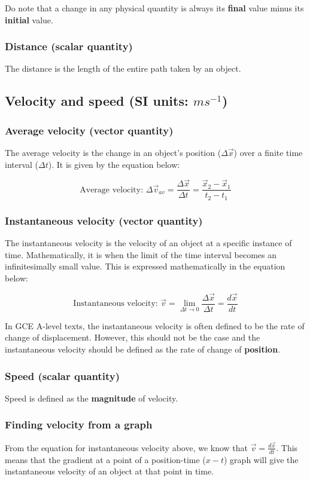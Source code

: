 \documentclass[11pt]{article}
\begin{document}
Do note that a change in any physical quantity is always its \textbf{final} value minus its \textbf{initial} value.
\subsubsection{Distance (scalar quantity)}
\label{sec:org10ef643}
The distance is the length of the entire path taken by an object.
\subsection{Velocity and speed (SI units: \(\si{ms^{-1}}\))}
\label{sec:orgc83176a}

\subsubsection{Average velocity (vector quantity)}
\label{sec:orgd958dd2}
The average velocity is the change in an object's position (\(\Delta \vec{x}\)) over a finite time interval (\(\Delta t\)). It is given by the equation below:

\[\text{Average velocity: } \Delta \vec{v}_{av} = \frac{\Delta \vec{x}}{\Delta t} = \frac{\vec{x}_2 - \vec{x}_1}{t_2 - t_1}\]
\subsubsection{Instantaneous velocity (vector quantity)}
\label{sec:orgadb11ac}
The instantaneous velocity is the velocity of an object at a specific instance of time. Mathematically, it is when the limit of the time interval becomes an infinitesimally small value. This is expressed mathematically in the equation below:

\[\text{Instantaneous velocity: } \vec{v} = \lim_{\Delta t \rightarrow 0} \frac{\Delta \vec{x}}{\Delta t} = \frac{d \vec{x}}{dt}\]

In GCE A-level texts, the instantaneous velocity is often defined to be the rate of change of displacement. However, this should not be the case and the instantaneous velocity should be defined as the rate of change of \textbf{position}.
\subsubsection{Speed (scalar quantity)}
\label{sec:org0766ed6}
Speed is defined as the \textbf{magnitude} of velocity.
\subsubsection{Finding velocity from a graph}
\label{sec:org8078355}
From the equation for instantaneous velocity above, we know that \(\vec{v} = \frac{d \vec{x}}{dt}\). This means that the gradient at a point of a position-time (\(x - t\)) graph will give the instantaneous velocity of an object at that point in time.
\end{document}
